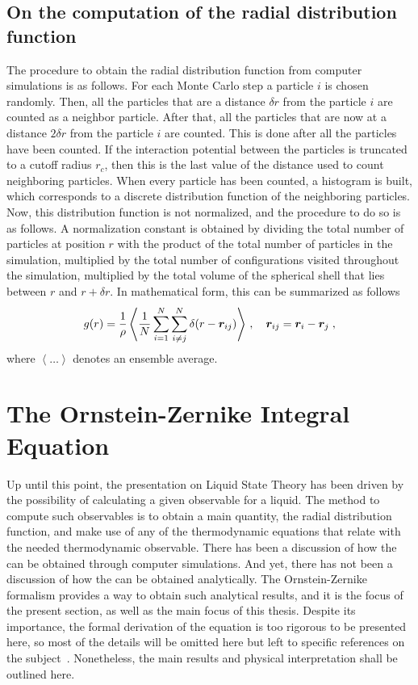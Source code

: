 \subsection{On the computation of the radial distribution function}
The procedure to obtain the radial distribution function from computer simulations is as
follows. For each Monte Carlo step a particle $i$ is chosen randomly.
Then, all the particles that are a distance $\delta r$ from the particle $i$ are counted
as a neighbor particle. After that, all the particles that are now at a distance
$2 \delta r$ from the particle $i$ are counted. This is done after all the particles
have been counted. If the interaction potential between the particles is truncated
to a cutoff radius $r_c$, then this is the last value of the distance used to count
neighboring particles. When every particle has been counted, a histogram is built,
which corresponds to a discrete distribution function of the neighboring particles. 
Now, this distribution function is not normalized, and the procedure to do so is as 
follows. A normalization constant is obtained by dividing the total number of particles at 
position $r$ with the product of the total number of particles in the simulation, 
multiplied by the total number of configurations visited throughout the simulation, 
multiplied by the total volume of the spherical shell that lies between $r$ and $r + \delta 
r$. In mathematical form, this can be summarized as follows
\begin{equation}
    g(r)=\frac{1}{\rho} \left\langle \frac{1}{N} \sum_{i=1}^{N} \sum_{i \neq j}^{N} 
    \delta (r - \bm{r}_{ij}) \right\rangle
    \, , \quad
    \bm{r}_{ij}=\bm{r}_{i} - \bm{r}_{j} \; ,
    \label{eq:rdf-simulation}
\end{equation}
where \(\left\langle \dots \right\rangle\) denotes an ensemble average.

\section{The Ornstein-Zernike Integral Equation} \label{sec:ornstein-zernike}
Up until this point, the presentation on Liquid State Theory has been driven by the
possibility of calculating a given observable for a liquid. The method to compute such
observables is to obtain a main quantity, the radial distribution function, and
make use of any of the thermodynamic equations that relate \rdf with the needed
thermodynamic observable. There has been a discussion of how the \rdf can be obtained
through computer simulations. And yet, there has not been a discussion of how the \rdf
can be obtained analytically. The Ornstein-Zernike formalism provides a way to obtain
such analytical results, and it is the focus of the present section, as well as the main 
focus of this thesis. Despite its importance, the formal derivation of the equation is too 
rigorous to be presented here, so most of the details will be omitted here but left to 
specific references on the subject~\cite{hansenTheorySimpleLiquids2013}. Nonetheless, the 
main results and physical interpretation shall be outlined here.

